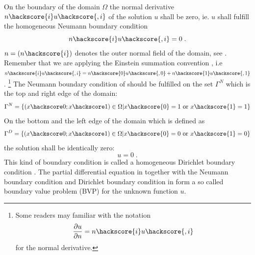 On the boundary of the domain $\Omega$ the normal derivative $n\hackscore{i} u\hackscore{,i}$
of the solution $u$ shall be zero, ie. $u$ shall fulfill
the homogeneous Neumann boundary condition
\begin{equation}
n\hackscore{i} u\hackscore{,i}= 0 \;.
\label{eq:FirstSteps.2}
\end{equation}
$n=(n\hackscore{i})$ denotes the outer normal field
of the domain, see . Remember that we 
are applying the Einstein summation convention , i.e
$n\hackscore{i} u\hackscore{,i}= n\hackscore{0} u\hackscore{,0} +
n\hackscore{1} u\hackscore{,1}$. 
\footnote{Some readers may familiar with the notation
\begin{equation*}
\frac{\partial u}{\partial n} = n\hackscore{i} u\hackscore{,i}
\end{equation*}
for the normal derivative.}
The Neumann boundary condition of  should be fulfilled on the
set $\Gamma^N$ which is the top and right edge of the domain:
\begin{equation}
\Gamma^N=\{(x\hackscore 0;x\hackscore 1) \in \Omega | x\hackscore{0}=1 \mbox{ or } x\hackscore{1}=1  \}
\label{eq:FirstSteps.2b}
\end{equation}
On the bottom and the left edge of the domain which is defined
as 
\begin{equation}
\Gamma^D=\{(x\hackscore 0;x\hackscore 1) \in \Omega | x\hackscore{0}=0 \mbox{ or } x\hackscore{1}=0  \}
\label{eq:FirstSteps.2c}
\end{equation}
the solution shall be identically zero:
\begin{equation}
u=0 \; .
\label{eq:FirstSteps.2d}
\end{equation}
This kind of boundary condition is called a homogeneous Dirichlet boundary condition
. The partial differential equation in  together
with the Neumann boundary condition  and 
Dirichlet boundary condition in  form a so
called boundary value
problem (BVP) for 
the unknown
function $u$. 


